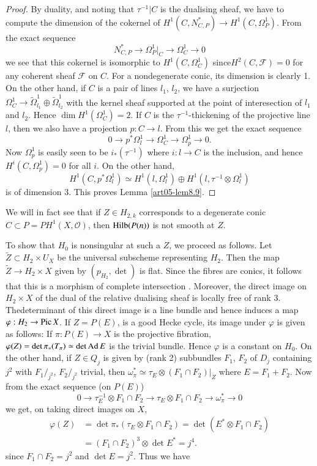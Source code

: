 \begin{proof}
By duality, and noting that $\tau^{-1}|C$ is the dualising sheaf, we
have to compute the dimension of the cokernel of
$H^{1}(C,N^{*}_{C,P})\to H^{1}(C,\Omega^{1}_{P})$. From the exact
sequence
$$
N^{*}_{C,P}\to \Omega^{1}_{P}|_{C}\to \Omega^{1}_{C}\to 0
$$
we see that this cokernel is isomorphic to $H^{1}(C,\Omega^{1}_{C})$
since\break $H^{2}(C,\mathscr{F})=0$ for any coherent sheaf $\mathscr{F}$ on
$C$. For a nondegenerate conic, its dimension is clearly 1. On the
other hand, if $C$ is a pair of lines $l_{1}$, $l_{2}$, we have a
surjection
$\Omega^{1}_{C}\to \widetilde{\Omega}^{1}_{l_{1}}\oplus \widetilde{\Omega}^{1}_{l_{2}}$
with the kernel sheaf supported at the point of interesection of
$l_{1}$ and $l_{2}$. Hence $\dim H^{1}(\Omega^{1}_{C})=2$. If $C$ is
the $\tau^{-1}$-thickening of the projective line $l$, then we also
have a projection $p:C\to l$. From this we get the exact sequence
$$
0\to p^{*}\Omega^{1}_{l}\to \Omega^{1}_{C}\to \Omega^{1}_{p}\to 0.
$$
Now $\Omega^{1}_{p}$ is easily seen to be $i_{*}(\tau^{-1})$ where
$i:l\to C$ is the inclusion, and hence $H^{i}(C,\Omega^{1}_{p})=0$ for
all $i$. On the other hand,
$$
H^{1}(C,p^{*}\Omega^{1}_{l})\simeq H^{1}(l,\Omega^{1}_{l})\oplus
H^{1}(l,\tau^{-1}\otimes \Omega^{1}_{l})
$$
is of dimension 3. This proves Lemma \ref{art05-lem8.9}.

\end{proof}
We will in fact see that if $Z\in H_{2,k}$ corresponds to a degenerate
conic $C\subset P=PH^{1}(X,\mathscr{O})$, then $\operatorname{Hilb}(P(n))$ is not
smooth at $Z$.

To show that $H_{0}$ is nonsingular at such a $Z$, we proceed as
follows. Let $\widetilde{Z}\subset H_{2}\times U_{X}$ be the universal
subscheme representing $H_{2}$. Then the map $\widetilde{Z}\to
H_{2}\times X$ given by $(p_{H_{2}},\det)$ is flat. Since the fibres
are conics, it follows that this is a morphism of complete
intersection \cite[SGA 6, VII]{art05-key9}. Moreover, the direct image
on $H_{2}\times X$ of the dual of the relative dualising sheaf is
locally free of rank 3. The\pageoriginale determinant of this direct
image is a line bundle and hence induces a map $\varphi:H_{2}\to \operatorname{Pic}
X$. If $Z=P(E)$, is a good Hecke cycle, its image under $\varphi$ is
given as follows: If $\pi:P(E)\to X$ is the projective fibration,
$\varphi(Z)=\det \pi_{*}(T_{\pi})\simeq \det \operatorname{Ad} E$ is the trivial
bundle. Hence $\varphi$ is a constant on $H_{0}$. On the other hand,
if $Z\in Q_{j}$ is given by (rank 2) subbundles $F_{1}$, $F_{2}$ of
$D_{j}$ containing $j^{2}$ with $F_{1}/_{j^{2}}$, $F_{2}/_{j^{2}}$
trivial, then $\omega^{*}_{\pi}\simeq \tau_{E}\otimes (F_{1}\cap
F_{2})|_{Z}$ where $E=F_{1}+F_{2}$. Now from the exact sequence (on
$P(E)$)
$$
0\to \tau^{-1}_{E}\otimes F_{1}\cap F_{2}\to \tau_{E}\otimes F_{1}\cap
F_{2}\to \omega^{*}_{\pi}\to 0
$$
we get, on taking direct images on $X$,
\begin{align*}
\varphi(Z) &= \det \pi_{*}(\tau_{E}\otimes F_{1}\cap
F_{2})=\det(E^{*}\otimes F_{1}\cap F_{2})\\
&= (F_{1}\cap F_{2})^{3}\otimes \det E^{*}=j^{4}.
\end{align*}
since $F_{1}\cap F_{2}=j^{2}$ and $\det E=j^{2}$. Thus we have


